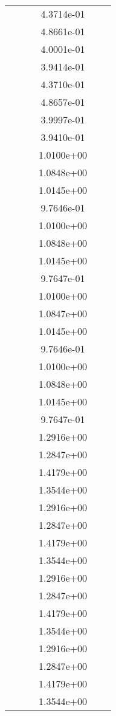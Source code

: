 \begin{xltabular}{\textwidth}{r|rS[table-format=1.3e+2]S[table-format=1.4e+2]S[table-format=1.4e+2]S[table-format=-1.5]}
&  &  & 4.3714e-01 & & \\
&  &  & 4.8661e-01 & & \\
&  &  & 4.0001e-01 & & \\
&  &  & 3.9414e-01 & & \\
&  &  & 4.3710e-01 & & \\
&  &  & 4.8657e-01 & & \\
&  &  & 3.9997e-01 & & \\
&  &  & 3.9410e-01 & & \\
&  &  & 1.0100e+00 & & \\
&  &  & 1.0848e+00 & & \\
&  &  & 1.0145e+00 & & \\
&  &  & 9.7646e-01 & & \\
&  &  & 1.0100e+00 & & \\
&  &  & 1.0848e+00 & & \\
&  &  & 1.0145e+00 & & \\
&  &  & 9.7647e-01 & & \\
&  &  & 1.0100e+00 & & \\
&  &  & 1.0847e+00 & & \\
&  &  & 1.0145e+00 & & \\
&  &  & 9.7646e-01 & & \\
&  &  & 1.0100e+00 & & \\
&  &  & 1.0848e+00 & & \\
&  &  & 1.0145e+00 & & \\
&  &  & 9.7647e-01 & & \\
&  &  & 1.2916e+00 & & \\
&  &  & 1.2847e+00 & & \\
&  &  & 1.4179e+00 & & \\
&  &  & 1.3544e+00 & & \\
&  &  & 1.2916e+00 & & \\
&  &  & 1.2847e+00 & & \\
&  &  & 1.4179e+00 & & \\
&  &  & 1.3544e+00 & & \\
&  &  & 1.2916e+00 & & \\
&  &  & 1.2847e+00 & & \\
&  &  & 1.4179e+00 & & \\
&  &  & 1.3544e+00 & & \\
&  &  & 1.2916e+00 & & \\
&  &  & 1.2847e+00 & & \\
&  &  & 1.4179e+00 & & \\
&  &  & 1.3544e+00 & & \\

\end{xltabular}
